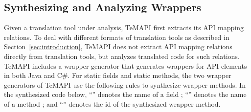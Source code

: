 
\subsection{Synthesizing and Analyzing Wrappers}
\label{sec:approach:wrapper}

Given a translation tool under analysis, TeMAPI first extracts its API mapping relations. To deal with different formats of translation tools as described in Section~\ref{sec:introduction}, TeMAPI does not extract API mapping relations directly from translation tools, but analyzes translated code for such relations. TeMAPI includes a wrapper generator that generates wrappers for API elements in both Java and C\#. For static fields and static methods, the two wrapper generators of TeMAPI use the following rules to synthesize wrapper methods. In the synthesized code below, ``'' denotes the name of a field ; ``'' denotes the name of a method ; and ``'' denotes the id of the synthesized wrapper method.

